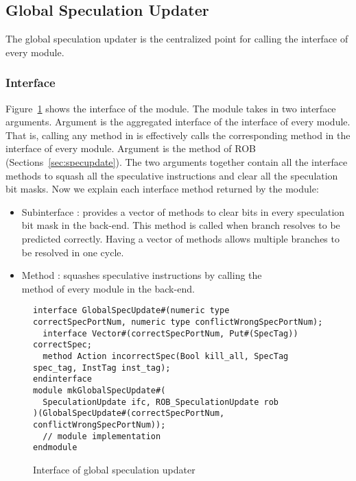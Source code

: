 \subsection{Global Speculation Updater}\label{sec:globalspec}

The global speculation updater is the centralized point for calling the  interface of every module.

\subsubsection{Interface}
Figure~\ref{fig:globalspec-ifc} shows the interface of the module.
The module takes in two interface arguments.
Argument  is the aggregated interface of the  interface of every module.
That is, calling any method in  is effectively calls the corresponding method in the  interface of every module.
Argument  is the  method of ROB (Sections~\ref{sec:specupdate}).
The two arguments together contain all the interface methods to squash all the speculative instructions and clear all the speculation bit masks.
Now we explain each interface method returned by the module:
\begin{itemize}
    \item Subinterface : provides a vector of methods to clear bits in every speculation bit mask in the back-end.
    This method is called when branch resolves to be predicted correctly.
    Having a vector of methods allows multiple branches to be resolved in one cycle.
    \item Method : squashes speculative instructions by calling the\\  method of every module in the back-end.
\end{itemize}

\begin{figure}
\begin{lstlisting}[caption={}]
interface GlobalSpecUpdate#(numeric type correctSpecPortNum, numeric type conflictWrongSpecPortNum);
  interface Vector#(correctSpecPortNum, Put#(SpecTag)) correctSpec;
  method Action incorrectSpec(Bool kill_all, SpecTag spec_tag, InstTag inst_tag);
endinterface
module mkGlobalSpecUpdate#(
  SpeculationUpdate ifc, ROB_SpeculationUpdate rob
)(GlobalSpecUpdate#(correctSpecPortNum, conflictWrongSpecPortNum));
  // module implementation
endmodule
\end{lstlisting}
\caption{Interface of global speculation updater}\label{fig:globalspec-ifc}
\end{figure}

